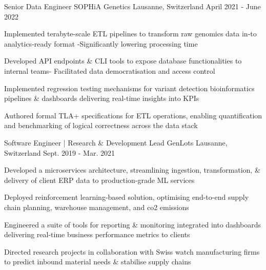 \begin{cventries}
 \cventry
    {Senior Data Engineer} %
    {SOPHiA Genetics} %
    {Lausanne, Switzerland} %
    {April 2021 - June 2022} %
    {
      \begin{cvitems} %
        \item {Implemented terabyte-scale ETL pipelines to transform raw genomics data in-to analytics-ready format -Significantly lowering processing time}
        \item {Developed API endpoints \& CLI tools to expose database functionalities to internal teams- Facilitated data democratisation and access control}
        \item {Implemented regression testing mechanisms for variant detection bioinformatics pipelines \& dashboards delivering real-time insights into KPIs}
        \item {Authored formal TLA+ specifications for ETL operations, enabling quantification and benchmarking of logical correctness across the data stack}
      \end{cvitems}
    }
    
    \vspace{-0.1cm}

  \cventry
    {Software Engineer | Research \& Development Lead} %
    {GenLots} %
    {Lausanne, Switzerland} %
    {Sept. 2019 - Mar. 2021} %
    {
      \begin{cvitems} %
        \item {Developed a microservices architecture, streamlining ingestion, transformation, \& delivery of client ERP data to production-grade ML services}
      	\item {Deployed reinforcement learning-based solution, optimising end-to-end supply chain planning, warehouse management, and co2 emissions}
        \item {Engineered a suite of tools for reporting \& monitoring integrated into dashboards delivering real-time business performance metrics to clients}
        \item {Directed research projects in collaboration with Swiss watch manufacturing firms to predict inbound material needs \& stabilise supply chains}
      \end{cvitems}
    } 
   
   \vspace{-0.1cm}


\end{cventries}
